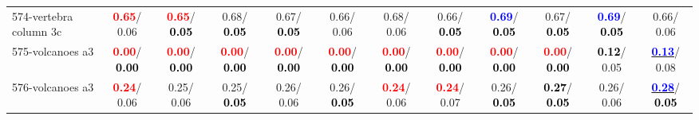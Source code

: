 \begin{table}[h]
\begin{center}
{\begin{tabular}{lc|c|c|c|c|c|c|c|c|c|c}
574-vertebra column 3c & \textcolor{red}{\textbf{  0.65}}/  0.06 & \textcolor{red}{\textbf{  0.65}}/\textcolor{black}{\textbf{  0.05}} &   0.68/\textcolor{black}{\textbf{  0.05}} &   0.67/\textcolor{black}{\textbf{  0.05}} &   0.66/  0.06 &   0.68/  0.06 &   0.66/\textcolor{black}{\textbf{  0.05}} & \textcolor{blue}{\textbf{  0.69}}/\textcolor{black}{\textbf{  0.05}} &   0.67/\textcolor{black}{\textbf{  0.05}} & \textcolor{blue}{\textbf{  0.69}}/\textcolor{black}{\textbf{  0.05}} &   0.66/  0.06 \\
575-volcanoes a3 & \textcolor{red}{\textbf{  0.00}}/\textcolor{black}{\textbf{  0.00}} & \textcolor{red}{\textbf{  0.00}}/\textcolor{black}{\textbf{  0.00}} & \textcolor{red}{\textbf{  0.00}}/\textcolor{black}{\textbf{  0.00}} & \textcolor{red}{\textbf{  0.00}}/\textcolor{black}{\textbf{  0.00}} & \textcolor{red}{\textbf{  0.00}}/\textcolor{black}{\textbf{  0.00}} & \textcolor{red}{\textbf{  0.00}}/\textcolor{black}{\textbf{  0.00}} & \textcolor{red}{\textbf{  0.00}}/\textcolor{black}{\textbf{  0.00}} & \textcolor{red}{\textbf{  0.00}}/\textcolor{black}{\textbf{  0.00}} & \textcolor{red}{\textbf{  0.00}}/\textcolor{black}{\textbf{  0.00}} & \textcolor{black}{\textbf{  0.12}}/  0.05 & \underline{\textcolor{blue}{\textbf{  0.13}}}/  0.08 \\
576-volcanoes a3 & \textcolor{red}{\textbf{  0.24}}/  0.06 &   0.25/  0.06 &   0.25/\textcolor{black}{\textbf{  0.05}} &   0.26/  0.06 &   0.26/\textcolor{black}{\textbf{  0.05}} & \textcolor{red}{\textbf{  0.24}}/  0.06 & \textcolor{red}{\textbf{  0.24}}/  0.07 &   0.26/\textcolor{black}{\textbf{  0.05}} & \textcolor{black}{\textbf{  0.27}}/\textcolor{black}{\textbf{  0.05}} &   0.26/  0.06 & \underline{\textcolor{blue}{\textbf{  0.28}}}/\textcolor{black}{\textbf{  0.05}} \\\end{tabular}}\label{stratsALCKappa17AllReduxHalfa}
\end{center}
\end{table}
